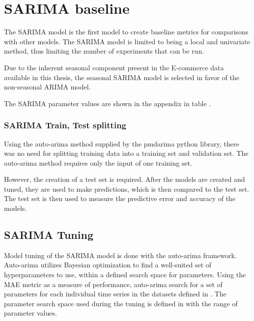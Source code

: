 
\section{SARIMA baseline}
\label{section:Method:SARIMA}

The SARIMA model is the first model to create baseline metrics for comparisons with other models.
The SARIMA model is limited to being a local and univariate method,
thus limiting the number of experiments that can be run.

Due to the inherent seasonal component present in the E-commerce data available in this thesis,
the seasonal SARIMA model is selected in favor of the non-seasonal ARIMA model.

The SARIMA parameter values are shown in the appendix in table .


\subsubsection{SARIMA Train, Test splitting}
Using the auto-arima method supplied by the pmdarima python library,
there was no need for splitting training data into a training set and validation set.
The auto-arima method requires only the input of one training set.

However, the creation of a test set is required.
After the models are created and tuned, they are used to make predictions,
which is then compared to the test set.
The test set is then used to measure the predictive error and accuracy of the models.




\subsection{SARIMA Tuning}
Model tuning of the SARIMA model is done with the auto-arima framework.
Auto-arima utilizes Bayesian optimization to find a well-suited set of hyperparameters to use,
within a defined search space for parameters.
Using the MAE metric as a measure of performance, auto-arima search for a set of parameters for each individual time series
in the datasets defined in .
The parameter search space used during the tuning is defined in  with the range of parameter values.

